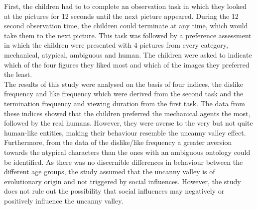 First, the children had to to complete an observation task in which they looked at the pictures for 12 seconds until the next picture appeared. During the 12 second observation time, the children could terminate at any time, which would take them to the next picture. This task was followed by a preference assessment in which the children were presented with 4 pictures from every category, mechanical, atypical, ambiguous  and human. The children were asked to indicate which of the four figures they liked most and which of the images they preferred the least.\\
The results of this study were analysed on the basis of four indices, the dislike frequency and like frequency which were derived from the second task and the termination frequency and viewing duration from the first task.
The data from these indices showed that the children preferred the mechanical agents the most, followed by the real humans. 
However, they were averse to the very but not quite human-like entities, making their behaviour resemble the uncanny valley effect. Furthermore, from the data of the dislike/like frequency a greater aversion towards the atypical characters than the ones with an ambiguous ontology could be identified. As there was no discernible differences in behaviour between the different age groups, the study assumed that the uncanny valley is of evolutionary origin and not triggered by social influences. However, the study does not rule out the possibility that social influences may negatively or positively influence the uncanny valley.\\




